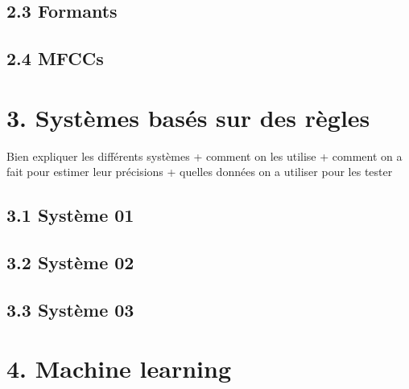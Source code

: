 \documentclass[a4paper,12pt]{report}	%
\begin{document}
{\subsection*{2.3 Formants}}

{\subsection*{2.4 MFCCs}}
	
{\section*{3. Systèmes basés sur des règles}}
	Bien expliquer les différents systèmes + comment on les utilise + comment on a fait pour estimer leur précisions + quelles données on a utiliser pour les tester

{\subsection*{3.1 Système 01}}

{\subsection*{3.2 Système 02}}

{\subsection*{3.3 Système 03}}

{\section*{4. Machine learning}}
\end{document}
